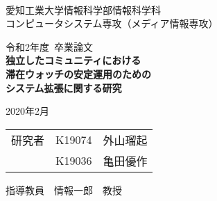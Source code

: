 \begin{titlepage}

  \ \\
  \begin{center}

    {\LARGE 愛知工業大学情報科学部情報科学科\\
      コンピュータシステム専攻（メディア情報専攻）

      \vspace{1.0cm}

      令和2年度~卒業論文\\

      \vspace{2.0cm}
      {\Huge
        \baselineskip=15mm
        \textbf{独立したコミュニティにおける\\滞在ウォッチの安定運用のための\\システム拡張に関する研究\\}}

      \vspace{7.0cm}

      2020年2月\\

      \vspace{1.0cm}

      \begin{tabular}[h]{lll}
        研究者 & K19074 & 外山瑠起 \\
               & K19036 & 亀田優作 \\
      \end{tabular}

      \vspace{1.0cm}

      指導教員\ \ 情報一郎\ \ 教授}

  \end{center}

\end{titlepage}
